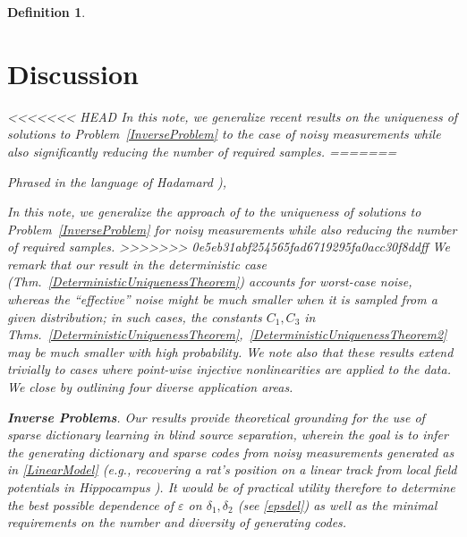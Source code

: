 \documentclass[9pt,twocolumn]{pnas-new}
\newtheorem{definition}{Definition}
\begin{document}
\begin{definition}
\section{Discussion}\label{Discussion}

<<<<<<< HEAD
In this note, we generalize recent results \cite{Hillar15} on the uniqueness of solutions to Problem~\ref{InverseProblem} to the case of noisy measurements while also significantly reducing the number of required samples.
=======


Phrased 
in the language of Hadamard \cite{Hadamard1902}), 
 


In this note, we generalize the approach of \cite{Hillar15} to the uniqueness of solutions to Problem~\ref{InverseProblem} for noisy measurements while also reducing the number of required samples.
>>>>>>> 0e5eb31abf254565fad6719295fa0acc30f8ddff
We remark that our result in the deterministic case (Thm.~\ref{DeterministicUniquenessTheorem}) accounts for \emph{worst-case} noise, whereas the ``effective'' noise might be much smaller when it is sampled from a given distribution; in such cases, the constants $C_1, C_3$ in Thms.~\ref{DeterministicUniquenessTheorem},~\ref{DeterministicUniquenessTheorem2} may be much smaller with high probability.
We note also that these results extend trivially to cases where point-wise injective nonlinearities are applied to the data. We close by outlining four diverse application areas.

\textbf{Inverse Problems}.  
Our results provide theoretical grounding for the use of sparse dictionary learning in blind source separation, wherein the goal is to infer the generating dictionary and sparse codes from noisy measurements generated as in \eqref{LinearModel} (e.g., recovering a rat's position on a linear track from local field potentials in Hippocampus \cite{Agarwal14}). It would be of practical utility therefore to determine the best possible dependence of $\varepsilon$ on $\delta_1, \delta_2$ (see \eqref{epsdel}) as well as the minimal requirements on the number and diversity of generating codes. %


\end{definition}
\end{document}
